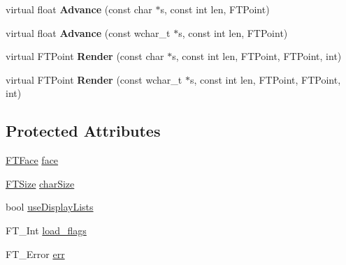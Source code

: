 \begin{DoxyCompactItemize}
\item 
virtual float {\bfseries Advance} (const char $\ast$s, const int len, F\+T\+Point)\hypertarget{class_f_t_font_impl_a237dc30760ac7d1b1e321da179a5055a}{}\label{class_f_t_font_impl_a237dc30760ac7d1b1e321da179a5055a}

\item 
virtual float {\bfseries Advance} (const wchar\+\_\+t $\ast$s, const int len, F\+T\+Point)\hypertarget{class_f_t_font_impl_a802bd5a2eefad0cdc27b22b63dab3de0}{}\label{class_f_t_font_impl_a802bd5a2eefad0cdc27b22b63dab3de0}

\item 
virtual F\+T\+Point {\bfseries Render} (const char $\ast$s, const int len, F\+T\+Point, F\+T\+Point, int)\hypertarget{class_f_t_font_impl_a1562233a391c602c155ee6ce5df8b4e9}{}\label{class_f_t_font_impl_a1562233a391c602c155ee6ce5df8b4e9}

\item 
virtual F\+T\+Point {\bfseries Render} (const wchar\+\_\+t $\ast$s, const int len, F\+T\+Point, F\+T\+Point, int)\hypertarget{class_f_t_font_impl_ad6f899bf03a580f616c8238b5ea0f419}{}\label{class_f_t_font_impl_ad6f899bf03a580f616c8238b5ea0f419}

\end{DoxyCompactItemize}
\subsection*{Protected Attributes}
\begin{DoxyCompactItemize}
\item 
\hyperlink{class_f_t_face}{F\+T\+Face} \hyperlink{class_f_t_font_impl_ab35b9e1966574c6bb88bff520e9c33df}{face}
\item 
\hyperlink{class_f_t_size}{F\+T\+Size} \hyperlink{class_f_t_font_impl_a9ec32ea40b0d1ea53442daec1bbaade1}{char\+Size}
\item 
bool \hyperlink{class_f_t_font_impl_a5c21ea909477c7180b86625fef6af457}{use\+Display\+Lists}
\item 
F\+T\+\_\+\+Int \hyperlink{class_f_t_font_impl_a217737b273e6abaa0dd6d837d5677e56}{load\+\_\+flags}
\item 
F\+T\+\_\+\+Error \hyperlink{class_f_t_font_impl_a39510c5a3665ae65bc7ff9b96c25b0c9}{err}
\end{DoxyCompactItemize}
